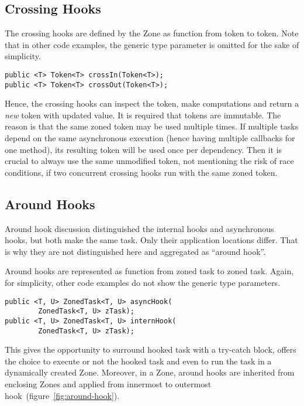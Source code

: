 \subsection*{Crossing Hooks}

The crossing hooks are defined by the Zone as function from token to token. Note that in other code examples, the generic type parameter is omitted for the sake of simplicity.

\begin{lstlisting}
public <T> Token<T> crossIn(Token<T>);
public <T> Token<T> crossOut(Token<T>);
\end{lstlisting}

Hence, the crossing hooks can inspect the token, make computations and return a \emph{new} token with updated value. It is required that tokens are immutable. The reason is that the same zoned token may be used multiple times. If multiple tasks depend on the same asynchronous execution (hence having multiple callbacks for one method), its resulting token will be used once per dependency. Then it is crucial to always use the same unmodified token, not mentioning the risk of race conditions, if two concurrent crossing hooks run with the same zoned token.

\subsection*{Around Hooks}

Around hook discussion distinguished the internal hooks and asynchronous hooks, but both make the same task. Only their application locations differ. That is why they are not distinguished here and aggregated as ``around hook''.

Around hooks are represented as function from zoned task to zoned task. Again, for simplicity, other code examples do not show the generic type parameters.

\begin{lstlisting}
public <T, U> ZonedTask<T, U> asyncHook(
        ZonedTask<T, U> zTask);
public <T, U> ZonedTask<T, U> internHook(
        ZonedTask<T, U> zTask);
\end{lstlisting}

This gives the opportunity to surround hooked task with a try-catch block, offers the choice to execute or not the hooked task and even to run the task in a dynamically created Zone. Moreover, in a Zone, around hooks are inherited from enclosing Zones and applied from innermost to outermost hook~(figure~\ref{fig:around-hook}).

